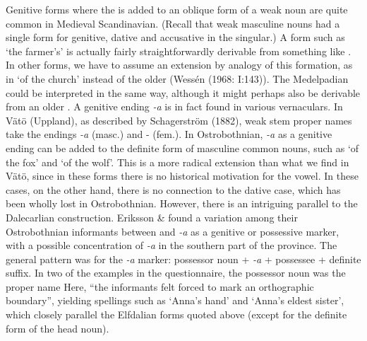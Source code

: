 Genitive forms where the is added to an oblique form of a weak noun are quite common in Medieval Scandinavian. (Recall that weak masculine nouns had a single form for genitive, dative and accusative in the singular.) A form such as  ‘the farmer’s’ is actually fairly straightforwardly derivable from something like . In other forms, we have to assume an extension by analogy of this formation, as in  ‘of the church’ instead of the older  (Wessén (1968: I:143)). The Medelpadian  could be interpreted in the same way, although it might perhaps also be derivable from an older . A genitive ending\textit{ {}-a} is in fact found in various vernaculars. In Vätö (Uppland), as described by Schagerström (1882), weak stem proper names take the endings\textit{ {}-a} (masc.) and \nobreakdash- (fem.). In Ostrobothnian,\textit{ {}-a} as a genitive ending can be added to the definite form of masculine common nouns, such as  ‘of the fox’ and  ‘of the wolf’. This is a more radical extension than what we find in Vätö, since in these forms there is no historical motivation for the  vowel. In these cases, on the other hand, there is no connection to the dative case, which has been wholly lost in Ostrobothnian. However, there is an intriguing parallel to the Dalecarlian construction. Eriksson \& \citet[43]{Rendahl1999} found a variation among their Ostrobothnian informants between and\textit{ {}-a} as a genitive or possessive marker, with a possible concentration of\textit{ {}-a} in the southern part of the province. The general pattern was for the\textit{ {}-a} marker: possessor noun +\textit{ {}-a} + possessee + definite suffix. In two of the examples in the questionnaire, the possessor noun was the proper name Here, “the informants felt forced to mark an orthographic boundary”, yielding spellings such as  ‘Anna’s hand’ and ‘Anna’s eldest sister’, which closely parallel the Elfdalian forms quoted above (except for the definite form of the head noun).

